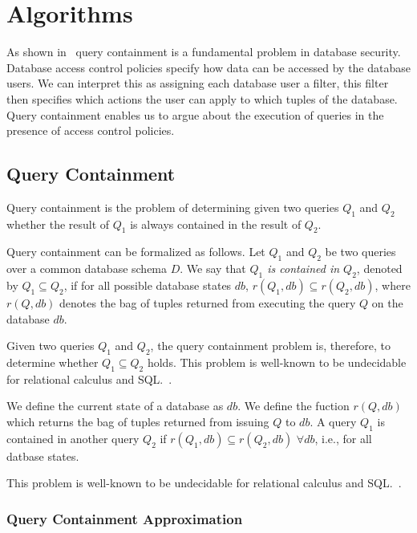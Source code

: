 \section{Algorithms}

As shown in~\cite{guarnieri2014optimal} query containment is a fundamental problem in database security.
%
Database access control policies specify how data can be accessed by the database users.
%
We can interpret this as assigning each database user a filter, this filter then specifies which actions the user can apply to which tuples of the database.
%
Query containment enables us to argue about the execution of queries in the presence of access control policies.

\subsection{Query Containment}

Query containment is the problem of determining given two queries $Q_1$ and $Q_2$ whether the result of $Q_1$ is always contained in the result of $Q_2$. %

Query containment can be formalized as follows.
%
Let $Q_1$ and $Q_2$ be two queries over a common database schema $D$.
%
We say that \emph{$Q_1$ is contained in $Q_2$}, denoted by $Q_1 \subseteq Q_2$, if for all possible database states $\mathit{db}$, $r(Q_1,\mathit{db}) \subseteq r(Q_2, \mathit{db})$, where $r(Q, db)$ denotes the bag of tuples returned from executing the query $Q$ on the database $db$.


Given two queries $Q_1$ and $Q_2$, the query containment problem is, therefore, to determine whether $Q_1 \subseteq Q_2$ holds.
%
This problem is well-known to be undecidable for relational calculus and SQL.~\cite{abiteboul1995foundations}.

We define the current state of a database as $db$.
%
We define the fuction $r(Q, db)$ which returns the bag of tuples returned from issuing $Q$ to $db$.
%
A query $Q_1$ is contained in another query $Q_2$ if $r(Q_1, db) \subseteq r(Q_2, db)$ $\forall db$, i.e., for all datbase states.

This problem is well-known to be undecidable for relational calculus and SQL.~\cite{abiteboul1995foundations}.

\subsubsection{Query Containment Approximation}

